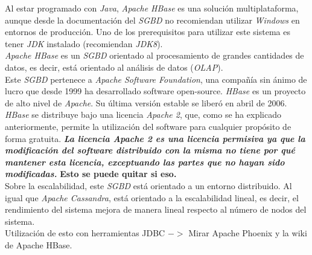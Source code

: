 \documentclass[11pt,a4paper]{article}
\begin{document}
Al estar programado con \emph{Java}, \emph{Apache HBase} es una solución multiplataforma, aunque desde la documentación del \emph{SGBD} no recomiendan utilizar \emph{Windows} en entornos de producción. Uno de los prerequisitos para utilizar este sistema es tener \emph{JDK} instalado (recomiendan \emph{JDK8}). \cite{AP:6}\\

\emph{Apache HBase} es un \emph{SGBD} orientado al procesamiento de grandes cantidades de datos, es decir, está orientado al análisis de datos (\emph{OLAP}).\\

Este \emph{SGBD} pertenece a \emph{Apache Software Foundation}, una compañía sin ánimo de lucro que desde 1999 ha desarrollado software open-source. \emph{HBase} es un proyecto de alto nivel de \emph{Apache}. Su última versión estable se liberó en abril de 2006. \cite{WIKI:8} \\

\emph{HBase} se distribuye bajo una licencia \emph{Apache 2}, que, como se ha explicado anteriormente, permite la utilización del software para cualquier propósito de forma gratuita. \textbf{\textit{La licencia \emph{Apache 2} es una licencia permisiva ya que la modificación del software distribuido con la misma no tiene por qué mantener esta licencia, exceptuando las partes que no hayan sido modificadas.}} \textbf{{\Large Esto se puede quitar si eso}.} \cite{WIKI:6}\\

Sobre la escalabilidad, este \emph{SGBD} está orientado a un entorno distribuido. Al igual que \emph{Apache Cassandra}, está orientado a la escalabilidad lineal, es decir, el rendimiento del sistema mejora de manera lineal respecto al número de nodos del sistema. \cite{AP:7} \\



Utilización de esto con herramientas JDBC $->$  Mirar Apache Phoenix y la wiki de Apache HBase.\\


\newpage


\end{document}
